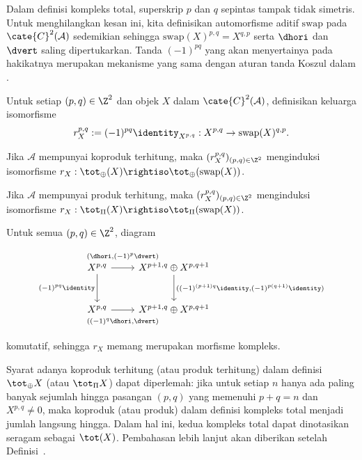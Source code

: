 Dalam definisi kompleks total, superskrip $p$ dan $q$ sepintas tampak tidak
simetris. Untuk menghilangkan kesan ini, kita definisikan automorfisme aditif
$\mathrm{swap}$ pada $\cate{C}^2(\mathcal{A})$ sedemikian sehingga
$\mathrm{swap}(X)^{p,q}=X^{q,p}$ serta $\dhori$ dan $\dvert$ saling
dipertukarkan. Tanda $(-1)^{pq}$ yang akan menyertainya pada hakikatnya
merupakan mekanisme yang sama dengan aturan tanda Koszul dalam
\cite[Definisi--Teorema~7.4.4]{Li1}.

\begin{proposisi}\label{prop:double-cplx-swap}
	Untuk setiap $(p,q)\in\Z^2$ dan objek $X$ dalam
	$\cate{C}^2(\mathcal{A})$, definisikan keluarga isomorfisme
	\[ r^{p, q}_X := (-1)^{pq} \identity_{X^{p,q}} : X^{p, q} \to \mathrm{swap}(X)^{q,p} . \]
	\begin{compactitem}
		\item Jika $\mathcal{A}$ mempunyai koproduk terhitung, maka
		$(r_X^{p,q})_{(p,q)\in\Z^2}$ menginduksi isomorfisme
		$r_X:\tot_{\oplus}(X)\rightiso\tot_{\oplus}(\mathrm{swap}(X))$.
		\item Jika $\mathcal{A}$ mempunyai produk terhitung, maka
		$(r_X^{p,q})_{(p,q)\in\Z^2}$ menginduksi isomorfisme
		$r_X:\tot_{\Pi}(X)\rightiso\tot_{\Pi}(\mathrm{swap}(X))$.
	\end{compactitem}
\end{proposisi}
\begin{bukti}
	Untuk semua $(p,q)\in\Z^2$, diagram
	\[\begin{tikzcd}[row sep=large]
		X^{p,q} \arrow[d, "(-1)^{pq} \identity"'] \arrow[r, "{ (\dhori, (-1)^p \dvert) }" inner sep=0.8em] & X^{p+1, q} \oplus X^{p, q+1} \arrow[d, "{((-1)^{(p+1)q} \identity, (-1)^{p(q+1)} \identity) }"] \\
		X^{p,q} \arrow[r, "{((-1)^q \dhori, \dvert)}"' inner sep=0.8em] & X^{p+1, q} \oplus X^{p, q+1}
	\end{tikzcd}\]
	komutatif, sehingga $r_X$ memang merupakan morfisme kompleks.
\end{bukti}

Syarat adanya koproduk terhitung (atau produk terhitung) dalam definisi
$\tot_{\oplus}X$ (atau $\tot_{\Pi}X$) dapat diperlemah: jika untuk setiap
$n$ hanya ada paling banyak sejumlah hingga pasangan $(p,q)$ yang memenuhi
$p+q=n$ dan $X^{p,q}\neq0$, maka koproduk (atau produk) dalam definisi
kompleks total menjadi jumlah langsung hingga. Dalam hal ini, kedua kompleks
total dapat dinotasikan seragam sebagai $\tot(X)$. Pembahasan lebih lanjut
akan diberikan setelah Definisi~.

